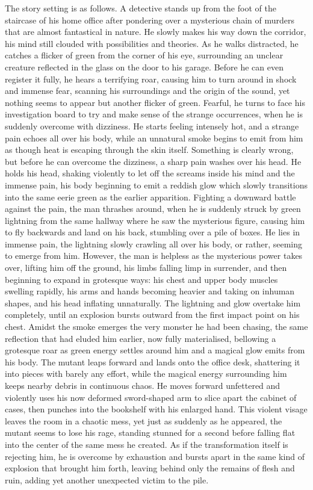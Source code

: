 \documentclass[12pt]{article}
\begin{document}
The story setting is as follows. A detective stands up from the foot of the staircase of his home office after pondering over a mysterious chain of murders that are almost fantastical in nature. He slowly makes his way down the corridor, his mind still clouded with possibilities and theories. As he walks distracted, he catches a flicker of green from the corner of his eye, surrounding an unclear creature reflected in the glass on the door to his garage. Before he can even register it fully, he hears a terrifying roar, causing him to turn around in shock and immense fear, scanning his surroundings and the origin of the sound, yet nothing seems to appear but another flicker of green. Fearful, he turns to face his investigation board to try and make sense of the strange occurrences, when he is suddenly overcome with dizziness. He starts feeling intensely hot, and a strange pain echoes all over his body, while an unnatural smoke begins to emit from him as though heat is escaping through the skin itself. Something is clearly wrong, but before he can overcome the dizziness, a sharp pain washes over his head. He holds his head, shaking violently to let off the screams inside his mind and the immense pain, his body beginning to emit a reddish glow which slowly transitions into the same eerie green as the earlier apparition. Fighting a downward battle against the pain, the man thrashes around, when he is suddenly struck by green lightning from the same hallway where he saw the mysterious figure, causing him to fly backwards and land on his back, stumbling over a pile of boxes. He lies in immense pain, the lightning slowly crawling all over his body, or rather, seeming to emerge from him. However, the man is helpless as the mysterious power takes over, lifting him off the ground, his limbs falling limp in surrender, and then beginning to expand in grotesque ways: his chest and upper body muscles swelling rapidly, his arms and hands becoming heavier and taking on inhuman shapes, and his head inflating unnaturally. The lightning and glow overtake him completely, until an explosion bursts outward from the first impact point on his chest. Amidst the smoke emerges the very monster he had been chasing, the same reflection that had eluded him earlier, now fully materialised, bellowing a grotesque roar as green energy settles around him and a magical glow emits from his body. The mutant leaps forward and lands onto the office desk, shattering it into pieces with barely any effort, while the magical energy surrounding him keeps nearby debris in continuous chaos. He moves forward unfettered and violently uses his now deformed sword-shaped arm to slice apart the cabinet of cases, then punches into the bookshelf with his enlarged hand. This violent visage leaves the room in a chaotic mess, yet just as suddenly as he appeared, the mutant seems to lose his rage, standing stunned for a second before falling flat into the center of the same mess he created. As if the transformation itself is rejecting him, he is overcome by exhaustion and bursts apart in the same kind of explosion that brought him forth, leaving behind only the remains of flesh and ruin, adding yet another unexpected victim to the pile.
\end{document}
